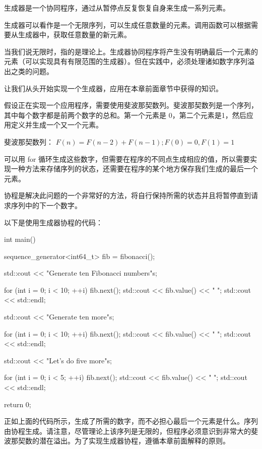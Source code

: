 

生成器是一个协同程序，通过从暂停点反复恢复自身来生成一系列元素。

生成器可以看作是一个无限序列，可以生成任意数量的元素。调用函数可以根据需要从生成器中，获取任意数量的新元素。

当我们说无限时，指的是理论上。生成器协同程序将产生没有明确最后一个元素的元素（可以实现具有有限范围的生成器）。但在实践中，必须处理诸如数字序列溢出之类的问题。

让我们从头开始实现一个生成器，应用在本章前面章节中获得的知识。


假设正在实现一个应用程序，需要使用斐波那契数列。斐波那契数列是一个序列，其中每个数字都是前两个数字的总和。第一个元素是 0，第二个元素是1，然后应用定义并生成一个又一个元素。

斐波那契数列： $F (n) = F (n − 2) + F (n − 1) ; F (0) = 0, F (1) = 1$

可以用 for 循环生成这些数字，但需要在程序的不同点生成相应的值，所以需要实现一种方法来存储序列的状态，还需要在程序的某个地方保存我们生成的最后一个元素。

协程是解决此问题的一个非常好的方法，将自行保持所需的状态并且将暂停直到请求序列中的下一个数字。

以下是使用生成器协程的代码：

\begin{cpp}
int main() {
    sequence_generator<int64_t> fib = fibonacci();

    std::cout << "Generate ten Fibonacci numbers\n"s;

    for (int i = 0; i < 10; ++i) {
        fib.next();
        std::cout << fib.value() << " ";
    }
    std::cout << std::endl;

    std::cout << "Generate ten more\n"s;

    for (int i = 0; i < 10; ++i) {
        fib.next();
        std::cout << fib.value() << " ";
    }
    std::cout << std::endl;

    std::cout << "Let's do five more\n"s;

    for (int i = 0; i < 5; ++i) {
        fib.next();
        std::cout << fib.value() << " ";
    }
    std::cout << std::endl;

    return 0;
}
\end{cpp}

正如上面的代码所示，生成了所需的数字，而不必担心最后一个元素是什么。序列由协程生成。请注意，尽管理论上该序列是无限的，但程序必须意识到非常大的斐波那契数的潜在溢出。为了实现生成器协程，遵循本章前面解释的原则。

